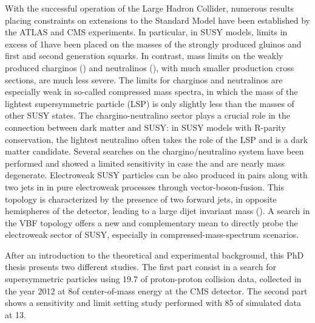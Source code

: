 With the successful operation of the Large Hadron Collider, numerous results placing constraints on extensions to the Standard Model have been established by the ATLAS and CMS experiments. In particular, in SUSY models, limits in excess of 1\tev have been placed on the masses of the strongly produced gluinos and first and second generation squarks. In contrast, mass limits on the weakly produced charginos (\charginopm) and neutralinos (\neutralinotwo), with much smaller production cross sections, are much less severe. The limits for charginos and neutralinos are especially weak in so-called compressed mass spectra, in which the mass of the lightest supersymmetric particle (LSP) is only slightly less than the masses of other SUSY states. The chargino-neutralino sector plays a crucial role in the connection between dark matter and SUSY: in SUSY models with R-parity conservation, the lightest neutralino \neutralinoone often takes the role of the LSP and is a dark matter candidate. Several searches on the chargino/neutralino system have been performed and showed a limited sensitivity in case the \charginopm and \neutralinoone are nearly mass degenerate. Electroweak SUSY particles can be also produced in pairs along with two jets in in pure electroweak processes through vector-boson-fusion. This topology is characterized by the presence of two forward jets, in opposite hemispheres of the detector, leading to a large dijet invariant mass (\mjj). A search in the VBF topology offers a new and complementary mean to directly probe the electroweak sector of SUSY, especially in compressed-mass-spectrum scenarios.

After an introduction to the theoretical and experimental background, this PhD thesis presents two different studies. The first part consist in a search for supersymmetric particles using 19.7 \invfb of proton-proton collision data, collected in the year 2012 at 8\tev of center-of-mass energy at the CMS detector. The second part shows a sensitivity and limit setting study performed with 85 \invfb of simulated data at 13\tev.
